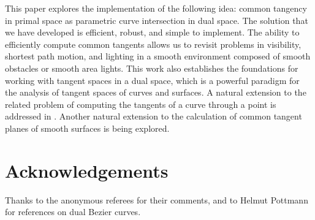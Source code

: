 \documentclass[10pt,twocolumn]{article}
\newcommand{\tang}{tangential curve\ }
\begin{document}
This paper explores the implementation of the following idea:
common tangency in primal space as parametric curve intersection in dual space.
The solution that we have developed is efficient, robust, and simple to implement.
The ability to efficiently compute common tangents
allows us to revisit problems in visibility, shortest path motion, and lighting
in a smooth environment composed of smooth obstacles or smooth area lights.
This work also establishes the foundations for
working with tangent spaces in a dual space, which is a powerful
paradigm for the analysis of tangent spaces of curves and surfaces.
A natural extension to
the related problem of computing the tangents of a curve through a point
is addressed in \cite{jj00pole}.
Another natural extension to the calculation of common tangent planes of 
smooth surfaces is being explored.

\section{Acknowledgements}

Thanks to the anonymous referees for their comments,
and to Helmut Pottmann for references on dual Bezier curves.

\end{document}
